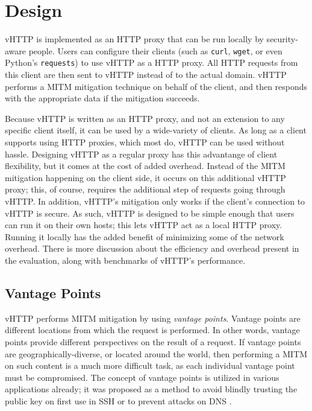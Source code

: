 \section{Design}
\label{sec:design}

vHTTP is implemented as an HTTP proxy that can be run locally by security-aware
people. Users can configure their clients (such as \texttt{curl},
\texttt{wget}, or even Python's \texttt{requests}) to use vHTTP as a HTTP
proxy. All HTTP requests from this client are then sent to vHTTP instead of
to the actual domain. vHTTP performs a MITM mitigation technique on behalf of
the client, and then responds with the appropriate data if the mitigation
succeeds.

Because vHTTP is written as an HTTP proxy, and not an extension to any specific
client itself, it can be used by a wide-variety of clients. As long as a client
supports using HTTP proxies, which most do, vHTTP can be used without hassle.
Designing vHTTP as a regular proxy has this advantange of client flexibility,
but it comes at the cost of added overhead. Instead of the MITM mitigation
happening on the client side, it occurs on this additional vHTTP proxy; this,
of course, requires the additional step of requests going through vHTTP. In
addition, vHTTP's mitigation only works if the client's connection to vHTTP
is secure. As such, vHTTP is designed to be simple enough that users can run
it on their own hosts; this lets vHTTP act as a local HTTP proxy. Running it
locally has the added benefit of minimizing some of the network overhead. There
is more discussion about the efficiency and overhead present in the evaluation,
along with benchmarks of vHTTP's performance.

\subsection{Vantage Points}

vHTTP performs MITM mitigation by using \textit{vantage points}. Vantage points
are different locations from which the request is performed. In other words,
vantage points provide different perspectives on the result of a request. If
vantage points are geographically-diverse, or located around the world, then
performing a MITM on such content is a much more difficult task, as each
individual vantage point must be compromised. The concept of vantage points
is utilized in various applications already; it was proposed as a method to
avoid blindly trusting the public key on first use in SSH \cite{Perspectives}
or to prevent attacks on DNS \cite{Hotpets17, ConfiDNS}.

